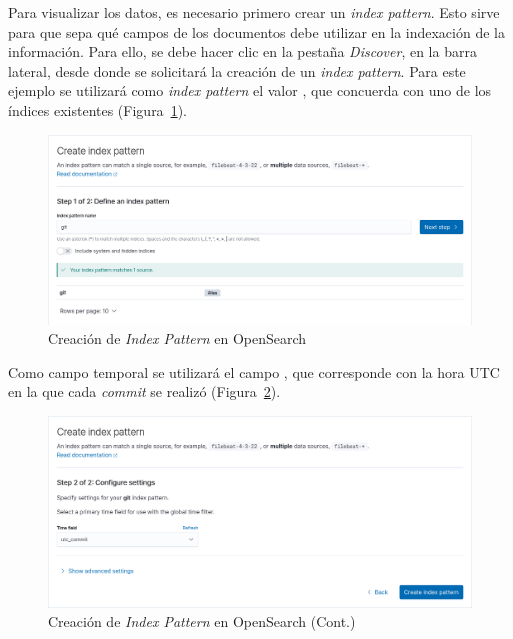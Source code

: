 Para visualizar los datos, es necesario primero crear un \emph{index pattern}. Esto sirve para que  sepa qué campos de los documentos debe utilizar en la indexación de la información. Para ello, se debe hacer clic en la pestaña \emph{Discover}, en la barra lateral, desde donde se solicitará la creación de un \emph{index pattern}. Para este ejemplo se utilizará como \emph{index pattern} el valor , que concuerda con uno de los índices existentes (Figura~\ref{fig:opensearch-index-pattern-creation}).

\begin{figure}[ht]
    \centering
    \includegraphics[width=\textwidth]{Figures/opensearch-index-pattern-creation.png}
    \decoRule
    \caption[OpenSearch (Creación de \emph{Index Pattern})]{Creación de \emph{Index Pattern} en OpenSearch}
    \label{fig:opensearch-index-pattern-creation}
\end{figure}

Como campo temporal se utilizará el campo , que corresponde con la hora UTC en la que cada \emph{commit} se realizó (Figura~\ref{fig:opensearch-index-pattern-timestamp}).

\begin{figure}[ht]
    \centering
    \includegraphics[width=\textwidth]{Figures/opensearch-index-pattern-timestamp.png}
    \decoRule
    \caption[OpenSearch (Creación de \emph{Index Pattern}) Cont.]{Creación de \emph{Index Pattern} en OpenSearch (Cont.)}
    \label{fig:opensearch-index-pattern-timestamp}
\end{figure}

